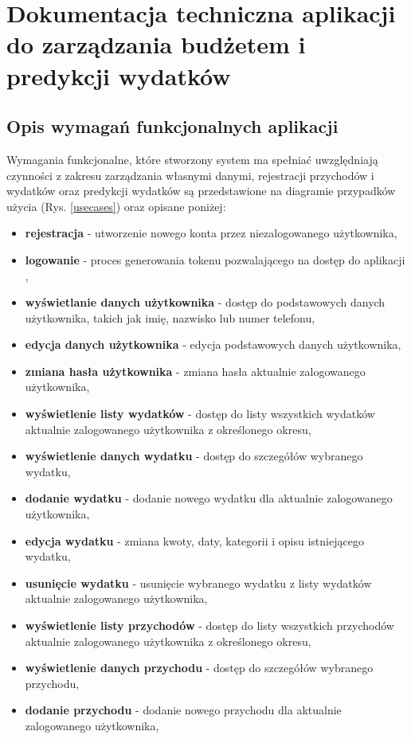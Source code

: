 \chapter{Dokumentacja techniczna aplikacji do zarządzania budżetem i predykcji wydatków}
\section{Opis wymagań funkcjonalnych aplikacji}
Wymagania funkcjonalne, które stworzony system ma spełniać uwzględniają czynności z zakresu zarządzania własnymi danymi, rejestracji przychodów i wydatków oraz predykcji wydatków są przedstawione na diagramie przypadków użycia (Rys. \ref{usecases}) oraz opisane poniżej:
\begin{itemize}
	\item\textbf{rejestracja} - utworzenie nowego konta przez niezalogowanego użytkownika, 
	\item\textbf{logowanie} - proces generowania tokenu pozwalającego na dostęp do aplikacji ,
	\item\textbf{wyświetlanie danych użytkownika} - dostęp do podstawowych danych użytkownika, takich jak imię, nazwisko lub numer telefonu,
	\item\textbf{edycja danych użytkownika} - edycja podstawowych danych użytkownika,
	\item\textbf{zmiana hasła użytkownika} - zmiana hasła aktualnie zalogowanego użytkownika,
	\item\textbf{wyświetlenie listy wydatków} - dostęp do listy wszystkich wydatków aktualnie zalogowanego użytkownika z określonego okresu,
	\item\textbf{wyświetlenie danych wydatku} - dostęp do szczegółów wybranego wydatku,
	\item\textbf{dodanie wydatku} - dodanie nowego wydatku dla aktualnie zalogowanego użytkownika,
	\item\textbf{edycja wydatku} - zmiana kwoty, daty, kategorii i opisu istniejącego wydatku,
	\item\textbf{usunięcie wydatku} - usunięcie wybranego wydatku z listy wydatków aktualnie zalogowanego użytkownika,
	\item\textbf{wyświetlenie listy przychodów} - dostęp do listy wszystkich przychodów aktualnie zalogowanego użytkownika z określonego okresu,
	\item\textbf{wyświetlenie danych przychodu} - dostęp do szczegółów wybranego przychodu,
	\item\textbf{dodanie przychodu} - dodanie nowego przychodu dla aktualnie zalogowanego użytkownika,

\end{itemize}
